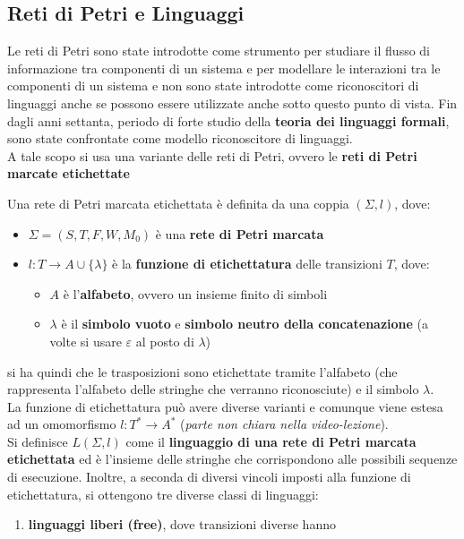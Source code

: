 \documentclass[a4paper,12pt, oneside]{book}
\begin{document}
\subsection{Reti di Petri e Linguaggi}
Le reti di Petri sono state introdotte come strumento per studiare il flusso di
informazione tra componenti di un sistema e per modellare le interazioni tra le
componenti di un sistema e non sono state introdotte come riconoscitori di
linguaggi anche se possono essere utilizzate anche sotto questo punto di
vista. Fin dagli anni settanta, periodo di forte studio della \textbf{teoria dei
linguaggi formali}, sono state confrontate come modello riconoscitore di
linguaggi.\\
A tale scopo si usa una variante delle reti di Petri, ovvero le \textbf{reti di
  Petri marcate etichettate}
\begin{definizione}
  Una rete di Petri marcata etichettata è definita da una coppia $(\Sigma, l)$,
  dove:
  \begin{itemize}
    \item $\Sigma =(S, T , F , W ,M_0)$ è una \textbf{rete di Petri marcata}
    \item $l:T\to A\cup\{\lambda\}$ è la \textbf{funzione di etichettatura}
    delle transizioni $T$, dove:
    \begin{itemize}
      \item $A$ è l'\textbf{alfabeto}, ovvero un insieme finito di simboli
      \item $\lambda$ è il \textbf{simbolo vuoto} e \textbf{simbolo neutro della
        concatenazione} (a volte si usare $\varepsilon$ al posto di $\lambda$)
    \end{itemize}
  \end{itemize}
  si ha quindi che le trasposizioni sono etichettate tramite l'alfabeto (che
  rappresenta l'alfabeto delle stringhe che verranno riconosciute) e il
  simbolo $\lambda$. \\
  La funzione di etichettatura può avere diverse varianti e comunque viene
  estesa ad un omomorfismo $l:T^*\to A^*$ (\emph{parte non chiara nella
    video-lezione}).\\
  Si definisce $L(\Sigma, l)$ come il \textbf{linguaggio di una rete di Petri
    marcata etichettata} ed è l'insieme delle stringhe che corrispondono alle
  possibili sequenze di esecuzione. Inoltre, a seconda di diversi vincoli
  imposti alla funzione di etichettatura, si ottengono tre diverse classi di
  linguaggi:
  \begin{enumerate}
    \item \textbf{linguaggi liberi (free)}, dove transizioni diverse hanno

\end{enumerate}
\end{definizione}
\end{document}
